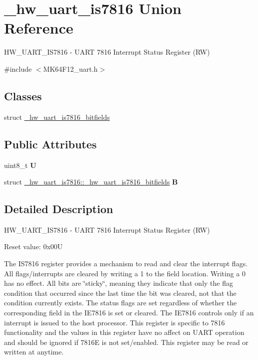 \hypertarget{union__hw__uart__is7816}{}\section{\+\_\+hw\+\_\+uart\+\_\+is7816 Union Reference}
\label{union__hw__uart__is7816}


H\+W\+\_\+\+U\+A\+R\+T\+\_\+\+I\+S7816 -\/ U\+A\+RT 7816 Interrupt Status Register (RW)  




{\ttfamily \#include $<$M\+K64\+F12\+\_\+uart.\+h$>$}

\subsection*{Classes}
\begin{DoxyCompactItemize}
\item 
struct \hyperlink{struct__hw__uart__is7816_1_1__hw__uart__is7816__bitfields}{\+\_\+hw\+\_\+uart\+\_\+is7816\+\_\+bitfields}
\end{DoxyCompactItemize}
\subsection*{Public Attributes}
\begin{DoxyCompactItemize}
\item 
uint8\+\_\+t {\bfseries U}\hypertarget{union__hw__uart__is7816_a74064426b70922ed149b7af38d30f86f}{}\label{union__hw__uart__is7816_a74064426b70922ed149b7af38d30f86f}

\item 
struct \hyperlink{struct__hw__uart__is7816_1_1__hw__uart__is7816__bitfields}{\+\_\+hw\+\_\+uart\+\_\+is7816\+::\+\_\+hw\+\_\+uart\+\_\+is7816\+\_\+bitfields} {\bfseries B}\hypertarget{union__hw__uart__is7816_a410877caeebf8241a4c5fbc43be71eb1}{}\label{union__hw__uart__is7816_a410877caeebf8241a4c5fbc43be71eb1}

\end{DoxyCompactItemize}


\subsection{Detailed Description}
H\+W\+\_\+\+U\+A\+R\+T\+\_\+\+I\+S7816 -\/ U\+A\+RT 7816 Interrupt Status Register (RW) 

Reset value\+: 0x00U

The I\+S7816 register provides a mechanism to read and clear the interrupt flags. All flags/interrupts are cleared by writing a 1 to the field location. Writing a 0 has no effect. All bits are \char`\"{}sticky\char`\"{}, meaning they indicate that only the flag condition that occurred since the last time the bit was cleared, not that the condition currently exists. The status flags are set regardless of whether the corresponding field in the I\+E7816 is set or cleared. The I\+E7816 controls only if an interrupt is issued to the host processor. This register is specific to 7816 functionality and the values in this register have no affect on U\+A\+RT operation and should be ignored if 7816E is not set/enabled. This register may be read or written at anytime. 

